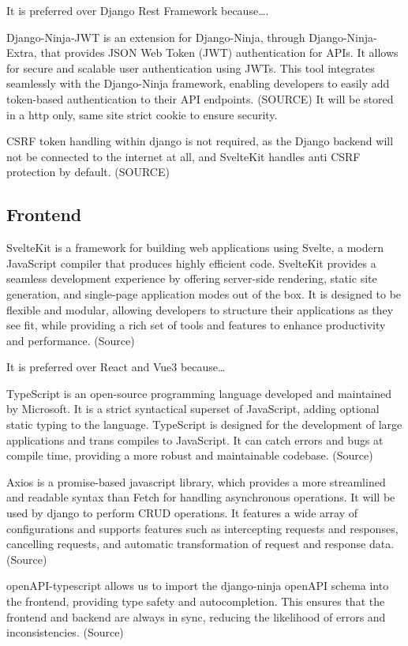 It is preferred over Django Rest Framework because….

Django-Ninja-JWT is an extension for Django-Ninja, through Django-Ninja-Extra, that provides JSON Web Token (JWT) authentication for APIs. It allows for secure and scalable user authentication using JWTs. This tool integrates seamlessly with the Django-Ninja framework, enabling developers to easily add token-based authentication to their API endpoints. (SOURCE) It will be stored in a http only, same site strict cookie to ensure security. 

CSRF token handling within django is not required, as the Django backend will not be connected to the internet at all, and SvelteKit handles anti CSRF protection by default. (SOURCE)

\subsection{Frontend}
SvelteKit is a framework for building web applications using Svelte, a modern JavaScript compiler that produces highly efficient code. SvelteKit provides a seamless development experience by offering server-side rendering, static site generation, and single-page application modes out of the box. It is designed to be flexible and modular, allowing developers to structure their applications as they see fit, while providing a rich set of tools and features to enhance productivity and performance. (Source)

It is preferred over React and Vue3 because…

TypeScript is an open-source programming language developed and maintained by Microsoft. It is a strict syntactical superset of JavaScript, adding optional static typing to the language. TypeScript is designed for the development of large applications and trans compiles to JavaScript. It can catch errors and bugs at compile time, providing a more robust and maintainable codebase. (Source)


Axios is a promise-based javascript library, which provides a more streamlined and readable syntax than Fetch for handling asynchronous operations. It will be used by django to perform CRUD operations. It features a wide array of configurations and supports features such as intercepting requests and responses, cancelling requests, and automatic transformation of request and response data. (Source)

openAPI-typescript allows us to import the django-ninja openAPI schema into the frontend, providing type safety and autocompletion. This ensures that the frontend and backend are always in sync, reducing the likelihood of errors and inconsistencies. (Source)

